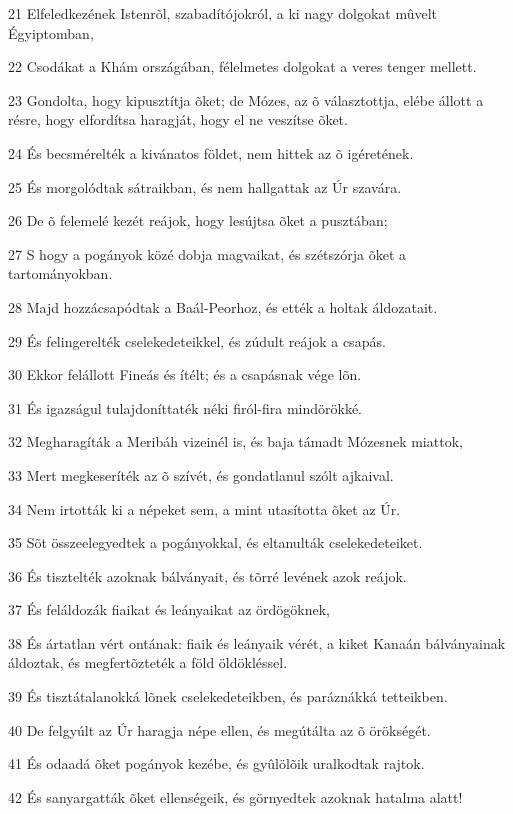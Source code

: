 \par 21 Elfeledkezének Istenrõl, szabadítójokról, a ki nagy dolgokat mûvelt Égyiptomban,
\par 22 Csodákat a Khám országában, félelmetes dolgokat a veres tenger mellett.
\par 23 Gondolta, hogy kipusztítja õket; de Mózes, az õ választottja, elébe állott a résre, hogy elfordítsa haragját, hogy el ne veszítse õket.
\par 24 És becsmérelték a kivánatos földet, nem hittek az õ igéretének.
\par 25 És morgolódtak sátraikban, és nem hallgattak az Úr szavára.
\par 26 De õ felemelé kezét reájok, hogy lesújtsa õket a pusztában;
\par 27 S hogy a pogányok közé dobja magvaikat, és szétszórja õket a tartományokban.
\par 28 Majd hozzácsapódtak a Baál-Peorhoz, és ették a holtak áldozatait.
\par 29 És felingerelték cselekedeteikkel, és zúdult reájok a csapás.
\par 30 Ekkor felállott Fineás és ítélt; és a csapásnak vége lõn.
\par 31 És igazságul tulajdoníttaték néki firól-fira mindörökké.
\par 32 Megharagíták a Meribáh vizeinél is, és baja támadt Mózesnek miattok,
\par 33 Mert megkeseríték az õ szívét, és gondatlanul szólt ajkaival.
\par 34 Nem irtották ki a népeket sem, a mint utasította õket az Úr.
\par 35 Sõt összeelegyedtek a pogányokkal, és eltanulták cselekedeteiket.
\par 36 És tisztelték azoknak bálványait, és tõrré levének azok reájok.
\par 37 És feláldozák fiaikat és leányaikat az ördögöknek,
\par 38 És ártatlan vért ontának: fiaik és leányaik vérét, a kiket Kanaán bálványainak áldoztak, és megfertõzteték a föld öldökléssel.
\par 39 És tisztátalanokká lõnek cselekedeteikben, és paráznákká tetteikben.
\par 40 De felgyúlt az Úr haragja népe ellen, és megútálta az õ örökségét.
\par 41 És odaadá õket pogányok kezébe, és gyûlölõik uralkodtak rajtok.
\par 42 És sanyargatták õket ellenségeik, és görnyedtek azoknak hatalma alatt!
